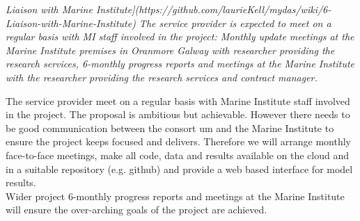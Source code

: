 
\textit{Liaison with Marine Institute](https://github.com/laurieKell/mydas/wiki/6-Liaison-with-Marine-Institute)
The service provider is expected to meet on a regular basis with MI staff involved in the project:
Monthly update meetings at the Marine Institute premises in Oranmore Galway with researcher providing the research services, 
6-monthly progress reports and meetings at the Marine Institute with the researcher providing the research services and contract manager.}

The service provider meet on a regular basis with Marine Institute staff involved in the project. 
The proposal is ambitious but achievable. However there needs to be good communication between the consort um and the Marine Institute to ensure the project keeps focused and delivers. Therefore we will arrange monthly face-to-face meetings, make all code, data and results available on the cloud and in a suitable repository (e.g. github) and provide a web based interface for model results.\\
Wider project 6-monthly progress reports and meetings at the Marine Institute will ensure the over-arching goals of the project are achieved.
